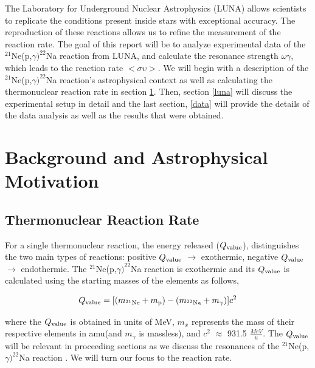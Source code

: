 \documentclass[a4paper,12pt]{article}
\def\reac{$^{21}$Ne(p,$\gamma)^{22}$Na reaction }
\def\Q{Q_{\rm{value}}}
\begin{document}
The Laboratory for Underground Nuclear Astrophysics (LUNA) allows scientists to replicate the conditions present inside stars with exceptional accuracy.  The reproduction of these reactions allows us to refine the measurement of the reaction rate.  The goal of this report will be to analyze experimental data of the $^{21}$Ne(p,$\gamma)^{22}$Na reaction from LUNA, and calculate the resonance strength $\omega\gamma$, which leads to the reaction rate  $<\sigma\upsilon>$. We will begin with a description of the $^{21}$Ne(p,$\gamma)^{22}$Na reaction's astrophysical context as well as calculating the thermonuclear reaction rate in section \ref{Background}. Then, section \ref{luna} will discuss the experimental setup in detail and the last section, \ref{data} will provide the details of the data analysis as well as the results that were obtained.  


\section{Background and Astrophysical Motivation}\label{Background}

\subsection{Thermonuclear Reaction Rate}\label{therm}



For a single thermonuclear reaction, the energy released ($Q_{\rm{value}}$), distinguishes the two main types of reactions: positive $Q_{\rm{value}}$ $\rightarrow$ exothermic, negative $Q_{\rm{value}}$ $\rightarrow$ endothermic.  The \reac is exothermic and its $\Q$ is calculated using the starting masses of the elements as follows,

\begin{equation}
    \Q = [(m_{\rm{^{21}Ne}} + m_{\rm{p}}) - (m_{\rm{^{22}Na}}+m_{\rm{\gamma}})]c^2
\end{equation}

where the $\Q$ is obtained in units of MeV, $m_x$ represents the mass of their respective elements in amu(and $m_{\gamma}$ is massless), and $c^2$ $\approx$ 931.5 $\frac{MeV}{u}$. The $\Q$ will be relevant in proceeding sections as we discuss the resonances of the \reac.  We will turn our focus to the reaction rate.    
\end{document}
